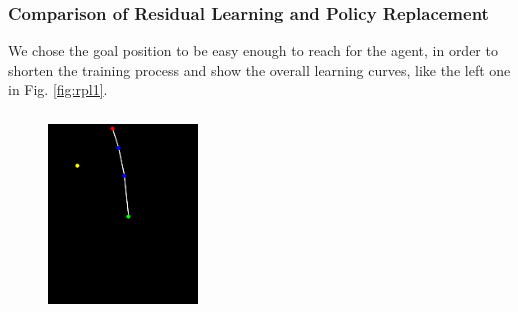 \documentclass{article}
\begin{document}
\subsubsection{Comparison of Residual Learning and Policy Replacement}
We chose the goal position to be easy enough to reach for the agent, in order to shorten the training process and show the overall learning curves, like the left one in Fig. \ref{fig:rpl1}.
\begin{figure}[htbp]
	\centering
	\includegraphics[width=150, height=200]{img/goal_position.png}
	\hspace{1cm}

\end{figure}
\end{document}
